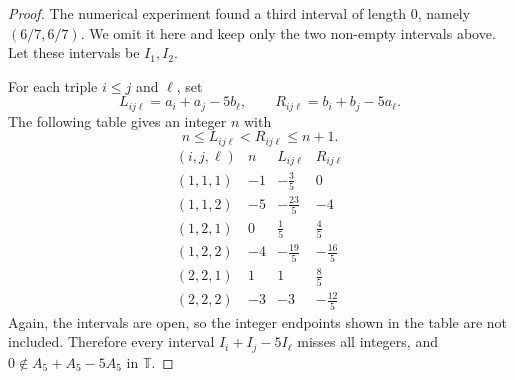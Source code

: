 \documentclass{article}
\begin{document}
\begin{proof}
The numerical experiment found a third interval of length \(0\), namely
\((6/7,6/7)\). We omit it here and keep only the two non-empty intervals above.
Let these intervals be \(I_1,I_2\).

For each triple \(i\leq j\) and \(\ell\), set
\[
    L_{ij\ell}=a_i+a_j-5b_\ell,
    \qquad
    R_{ij\ell}=b_i+b_j-5a_\ell.
\]
The following table gives an integer \(n\) with
\[
    n\leq L_{ij\ell}<R_{ij\ell}\leq n+1.
\]
\[
\begin{array}{c|c|c|c}
(i,j,\ell) & n & L_{ij\ell} & R_{ij\ell} \\
\hline
(1,1,1) & -1 & -\frac35 & 0 \\
(1,1,2) & -5 & -\frac{23}{5} & -4 \\
(1,2,1) & 0 & \frac15 & \frac45 \\
(1,2,2) & -4 & -\frac{19}{5} & -\frac{16}{5} \\
(2,2,1) & 1 & 1 & \frac85 \\
(2,2,2) & -3 & -3 & -\frac{12}{5}
\end{array}
\]
Again, the intervals are open, so the integer endpoints shown in the table are
not included. Therefore every interval \(I_i+I_j-5I_\ell\) misses all integers,
and \(0\notin A_5+A_5-5A_5\) in \(\mathbb T\).
\end{proof}
\end{document}
